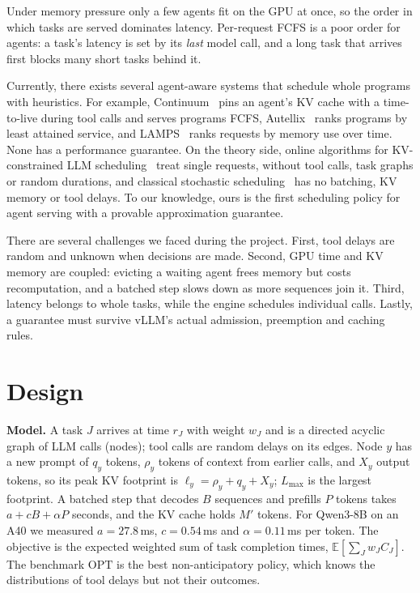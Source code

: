 \documentclass{article}
\newcommand{\OPT}{\mathrm{OPT}}
\begin{document}
Under memory pressure only a few agents fit on the GPU at once, so the order in
which tasks are served dominates latency. Per-request FCFS is a poor order for agents: a task's latency is set by
its \emph{last} model call, and a long task that arrives first blocks many short tasks behind it.

Currently, there exists several agent-aware systems that schedule whole programs with heuristics. For example,
Continuum~\cite{li2025continuum} pins an agent's KV cache with a time-to-live during tool calls and serves programs
FCFS, Autellix~\cite{luo2025autellix} ranks programs by least attained service, and
LAMPS~\cite{shahout2024lamps} ranks requests by memory use over time. None has a performance guarantee. On the
theory side, online algorithms for KV-constrained LLM scheduling~\cite{jaillet2025online} treat single requests,
without tool calls, task graphs or random durations, and classical stochastic
scheduling~\cite{mohring1999approximation,skutella2005stochastic} has no batching, KV memory or tool delays. To
our knowledge, ours is the first scheduling policy for agent serving with a provable approximation guarantee.

There are several challenges we faced during the project. First, tool delays are random and unknown when decisions are made. 
Second, GPU time and KV memory are coupled: evicting a waiting agent frees memory but costs recomputation, 
and a batched step slows down as more sequences join it. Third, latency belongs to whole tasks, while the engine schedules individual calls.
Lastly, a guarantee must survive vLLM's actual admission, preemption and caching rules.

\section{Design}
\label{sec:design}

\textbf{Model.} A task $J$ arrives at time $r_J$ with weight $w_J$ and is a directed acyclic graph of LLM calls
(nodes); tool calls are random delays on its edges. Node $y$ has a new prompt of $q_y$ tokens, $\rho_y$ tokens of
context from earlier calls, and $X_y$ output tokens, so its peak KV footprint is $\ell_y = \rho_y + q_y + X_y$;
$L_{\max}$ is the largest footprint. A batched step that decodes $B$ sequences and prefills $P$ tokens takes
$a + cB + \alpha P$ seconds, and the KV cache holds $M'$ tokens. For Qwen3-8B on an A40 we measured
$a = 27.8$\,ms, $c = 0.54$\,ms and $\alpha = 0.11$\,ms per token. The objective is the expected weighted sum of
task completion times, $\mathbb{E}[\sum_J w_J C_J]$. The benchmark $\OPT$ is the best non-anticipatory policy,
which knows the distributions of tool delays but not their outcomes.
\end{document}
